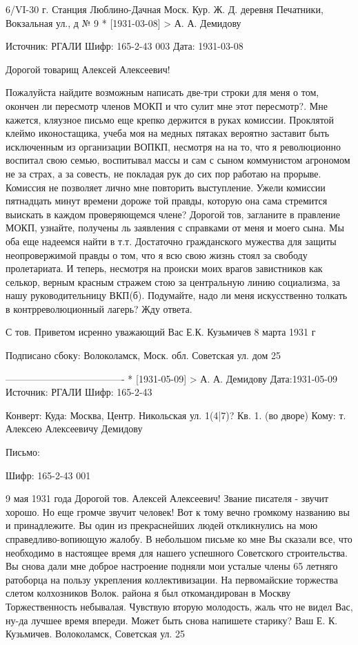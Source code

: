 6/VI-30 г.
Станция Люблино-Дачная Моск. Кур. Ж. Д. 
деревня Печатники, Вокзальная ул., д № 9
* [1931-03-08] > А. А. Демидову 

Источник: РГАЛИ
Шифр: 165-2-43 003
Дата: 1931-03-08

Дорогой товарищ
Алексей Алексеевич!

Пожалуйста найдите возможным написать две-три строки для меня о том, окончен ли пересмотр членов МОКП и что сулит мне этот пересмотр?.
Мне кажется, кляузное письмо еще крепко держится в руках комиссии. Проклятой клеймо иконостащика, учеба моя на медных пятаках вероятно заставит быть исключенным из организации ВОПКП, несмотря на на то, что я революционно воспитал свою семью, воспитывал массы и сам с сыном коммунистом агрономом не за страх, а за совесть, не покладая рук до сих пор работаю на прорыве.
Комиссия не позволяет лично мне повторить выступление. Ужели комиссии пятнадцать минут времени дороже той правды, которую она сама стремится выискать в каждом проверяющемся члене?
Дорогой тов, загланите в правление МОКП, узнайте, получены ль заявления с справками от меня и моего сына. Мы оба еще надеемся найти в т.т. Достаточно гражданского мужества для защиты неопровержимой правды о том, что я всю свою жизнь стоял за свободу пролетариата.
И теперь, несмотря на происки моих врагов завистников как селькор, верным красным стражем стою за центральную линию социализма, за нашу руководительницу ВКП(б). Подумайте, надо ли меня искусственно толкать в контрреволюционный лагерь? Жду ответа.

 С тов. Приветом исренно уважающий Вас
Е.К. Кузьмичев
8 марта 1931 г

Подписано сбоку:
Волоколамск, Моск. обл. Советская ул. дом 25


-------------------------------------
* [1931-05-09] > А. А. Демидову 
Дата:1931-05-09
Источник: РГАЛИ
Шифр: 165-2-43

Конверт:
Куда: Москва, Центр.
Никольская ул. 1(4|7)?
Кв. 1. (во дворе)
Кому: т. Алексею Алексеевичу Демидову



Письмо:

Шифр: 165-2-43 001

9 мая 1931 года
Дорогой тов. Алексей Алексеевич!
Звание писателя - звучит хорошо.
Но еще громче звучит человек! Вот к тому вечно громкому названию вы и принадлежите. Вы один из прекраснейших людей откликнулись на мою справедливо-вопиющую жалобу. В небольшом письме ко мне Вы сказали все, что необходимо в настоящее время для нашего успешного Советского строительства. Вы снова дали мне доброе настроение подняли мои усталые члены 65 летняго ратоборца на пользу укрепления коллективизации. На первомайские торжества слетом колхозников Волок. района я был откомандирован в Москву Торжественность небывалая. Чувствую вторую молодость, жаль что не видел Вас, ну-да лучшее время впереди. Может быть снова напишете старику?
Ваш Е. К. Кузьмичев. Волоколамск, Советская ул. 25



